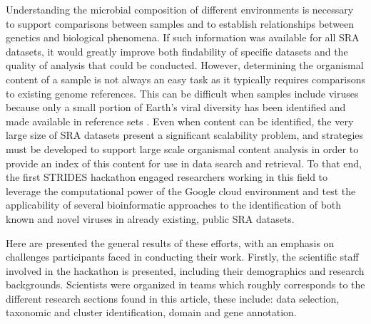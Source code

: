 Understanding the microbial composition of different environments is necessary
to support comparisons between samples and to establish relationships between
genetics and biological phenomena. If such information was available for all
SRA datasets, it would greatly improve both findability of specific datasets
and the quality of analysis that could be conducted. However, determining the
organismal content of a sample is not always an easy task as it typically
requires comparisons to existing genome references. This can be difficult when
samples include viruses because only a small portion of Earth’s viral diversity
has been identified and made available in reference sets \cite{Carroll2018}.
Even when content can be identified, the very large size of SRA datasets
present a significant scalability problem, and strategies must be developed to
support large scale organismal content analysis in order to provide an index of
this content for use in data search and retrieval. To that end, the first
STRIDES hackathon engaged researchers working in this field to leverage the
computational power of the Google cloud environment and test the applicability
of several bioinformatic approaches to the identification of both known and
novel viruses in already existing, public SRA datasets.


Here are presented the general results of these efforts, with an emphasis on
challenges participants faced in conducting their work. Firstly, the scientific
staff involved in the hackathon is presented, including their demographics and
research backgrounds. Scientists were organized in teams which roughly
corresponds to the different research sections found in this article, these
include: data selection, taxonomic and cluster identification, domain and gene
annotation.
